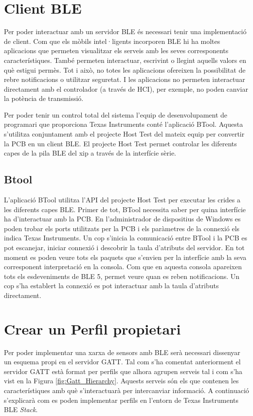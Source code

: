 \section{Client BLE}
Per poder interactuar amb un servidor BLE és necessari tenir una implementació de client.
Com que els mòbils intel·ligents incorporen BLE hi ha moltes aplicacions que permeten visualitzar els serveis amb les seves corresponents característiques.
També permeten interactuar, escrivint o llegint aquells valors en què estigui permès.
Tot i això, no totes les aplicacions ofereixen la possibilitat de rebre notificacions o utilitzar seguretat.
I les aplicacions no permeten interactuar directament amb el controlador (a través de HCI), per exemple, no poden canviar la potència de transmissió. 

Per poder tenir un control total del sistema l'equip de desenvolupament de programari que proporciona Texas Instruments conté l'aplicació BTool.
Aquesta s'utilitza conjuntament amb el projecte Host Test del mateix equip per convertir la PCB en un client BLE.
El projecte Host Test permet controlar les diferents capes de la pila BLE del xip a través de la interfície sèrie.

\subsection{Btool}
L'aplicació BTool utilitza l'API del projecte Host Test per executar les crides a les diferents capes BLE.
Primer de tot, BTool necessita saber per quina interfície ha d'interactuar amb la PCB.
En l'administrador de dispositius de Windows es poden trobar els ports utilitzats per la PCB i els paràmetres de la connexió els indica Texas Instruments\cite{serial_params}.
Un cop s'inicia la comunicació entre BTool i la PCB es pot escanejar, iniciar connexió i descobrir la taula d'atributs del servidor.
En tot moment es poden veure tots els paquets que s'envien per la interfície amb la seva corresponent interpretació en la consola.
Com que en aquesta consola apareixen tots els esdeveniments de BLE 5, permet veure quan es reben notificacions.
Un cop s'ha establert la connexió es pot interactuar amb la taula d'atributs directament.


\section{Crear un Perfil propietari}
Per poder implementar una xarxa de sensors amb BLE serà necessari dissenyar un esquema propi en el servidor GATT.
Tal com s'ha comentat anteriorment el servidor GATT està format per perfils que alhora agrupen serveis tal i com s'ha vist en la Figura \ref{fig:Gatt_Hierarchy}.
Aquests serveis són els que contenen les característiques amb què s'interactuarà per intercanviar informació.
A continuació s'explicarà com es poden implementar perfils en l'entorn de Texas Instruments BLE \textit{Stack}.


